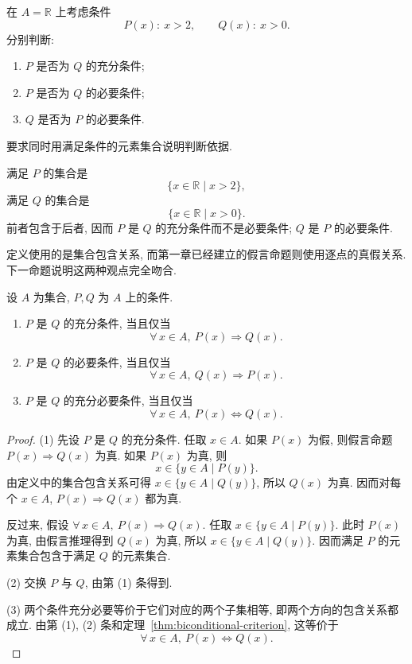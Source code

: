 \documentclass[usesamecnt, thmcnt=section, lang=cn, newtx, 10pt, scheme=chinese]{elegantbook}
\begin{document}
\begin{concept}\label{con:sets-10}
在 $A=\mathbb R$ 上考虑条件
\[
 P(x):\ x>2,
 \qquad
 Q(x):\ x>0.
\]
分别判断:
\begin{enumerate}[label=\rm(\arabic*)]
  \item $P $ 是否为 $Q $ 的充分条件;
  \item $P $ 是否为 $Q $ 的必要条件;
  \item $Q $ 是否为 $P $ 的必要条件.
\end{enumerate}
要求同时用满足条件的元素集合说明判断依据.
\end{concept}

\begin{solution}
满足 $P$ 的集合是
\[
 \{x\in\mathbb R\mid x>2\},
\]
满足 $Q$ 的集合是
\[
 \{x\in\mathbb R\mid x>0\}.
\]
前者包含于后者, 因而 $P$ 是 $Q$ 的充分条件而不是必要条件; $Q$ 是 $P$ 的必要条件.
\end{solution}

定义使用的是集合包含关系, 而第一章已经建立的假言命题则使用逐点的真假关系. 下一命题说明这两种观点完全吻合.

\begin{proposition}\label{prop:sets-condition-implication}
设 $A$ 为集合, $P ,Q $ 为 $A$ 上的条件.
\begin{enumerate}[label=\rm(\arabic*)]
  \item $P $ 是 $Q $ 的充分条件, 当且仅当
  \[
   \forall\,x\in A,\ P(x)\Rightarrow Q(x).
  \]
  \item $P $ 是 $Q $ 的必要条件, 当且仅当
  \[
   \forall\,x\in A,\ Q(x)\Rightarrow P(x).
  \]
  \item $P $ 是 $Q $ 的充分必要条件, 当且仅当
  \[
   \forall\,x\in A,\ P(x)\Leftrightarrow Q(x).
  \]
\end{enumerate}
\end{proposition}

\begin{proof}
(1) 先设 $P $ 是 $Q $ 的充分条件. 任取 $x\in A$. 如果 $P(x)$ 为假, 则假言命题 $P(x)\Rightarrow Q(x)$ 为真. 如果 $P(x)$ 为真, 则
\[
 x\in\{y\in A\mid P(y)\}.
\]
由定义中的集合包含关系可得 $x\in\{y\in A\mid Q(y)\}$, 所以 $Q(x)$ 为真. 因而对每个 $x\in A$, $P(x)\Rightarrow Q(x)$ 都为真.

反过来, 假设 $\forall\,x\in A,\ P(x)\Rightarrow Q(x)$. 任取 $x\in\{y\in A\mid P(y)\}$. 此时 $P(x)$ 为真, 由假言推理得到 $Q(x)$ 为真, 所以 $x\in\{y\in A\mid Q(y)\}$. 因而满足 $P$ 的元素集合包含于满足 $Q$ 的元素集合.

(2) 交换 $P $ 与 $Q $, 由第 (1) 条得到.

(3) 两个条件充分必要等价于它们对应的两个子集相等, 即两个方向的包含关系都成立. 由第 (1), (2) 条和定理~\ref{thm:biconditional-criterion}, 这等价于
\[
 \forall\,x\in A,\ P(x)\Leftrightarrow Q(x).
\]
\end{proof}
\end{document}
